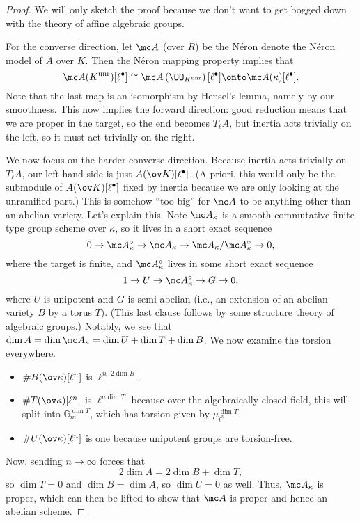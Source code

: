 \documentclass[../notes.tex]{subfiles}
\begin{document}
\begin{proof}
	We will only sketch the proof because we don't want to get bogged down with the theory of affine algebraic groups.

	For the converse direction, let $\mc A$ (over $R$) be the N\'eron denote the N\'eron model of $A$ over $K$. Then the N\'eron mapping property implies that
	\[\mc A(K^{\mathrm{unr}})[\ell^\bullet]\cong\mc A\left(\OO_{K^{\mathrm{unr}}}\right)[\ell^\bullet]\onto\mc A(\kappa)[\ell^\bullet].\]
	Note that the last map is an isomorphism by Hensel's lemma, namely by our smoothness. This now implies the forward direction: good reduction means that we are proper in the target, so the end becomes $T_\ell A$, but inertia acts trivially on the left, so it must act trivially on the right.

	We now focus on the harder converse direction. Because inertia acts trivially on $T_\ell A$, our left-hand side is just $A(\ov K)[\ell^\bullet]$. (A priori, this would only be the submodule of $A(\ov K)[\ell^\bullet]$ fixed by inertia because we are only looking at the unramified part.) This is somehow ``too big'' for $\mc A$ to be anything other than an abelian variety. Let's explain this. Note $\mc A_\kappa$ is a smooth commutative finite type group scheme over $\kappa$, so it lives in a short exact sequence
	\[0\to\mc A_\kappa^\circ\to\mc A_\kappa\to\mc A_\kappa/\mc A_\kappa^\circ\to0,\]
	where the target is finite, and $\mc A_\kappa^\circ$ lives in some short exact sequence
	\[1\to U\to\mc A_\kappa^\circ\to G\to0,\]
	where $U$ is unipotent and $G$ is semi-abelian (i.e., an extension of an abelian variety $B$ by a torus $T$). (This last clause follows by some structure theory of algebraic groups.) Notably, we see that $\dim A=\dim\mc A_\kappa=\dim U+\dim T+\dim B$. We now examine the torsion everywhere.
	\begin{itemize}
		\item $\#B(\ov\kappa)[\ell^n]$ is $\ell^{n\cdot2\dim B}$.
		\item $\#T(\ov\kappa)[\ell^n]$ is $\ell^{n\dim T}$ because over the algebraically closed field, this will split into $\mathbb G_m^{\dim T}$, which has torsion given by $\mu_{\ell^n}^{\dim T}$.
		\item $\#U(\ov\kappa)[\ell^n]$ is one because unipotent groups are torsion-free.
	\end{itemize}
	Now, sending $n\to\infty$ forces that
	\[2\dim A=2\dim B+\dim T,\]
	so $\dim T=0$ and $\dim B=\dim A$, so $\dim U=0$ as well. Thus, $\mc A_\kappa$ is proper, which can then be lifted to show that $\mc A$ is proper and hence an abelian scheme.
\end{proof}
\end{document}
